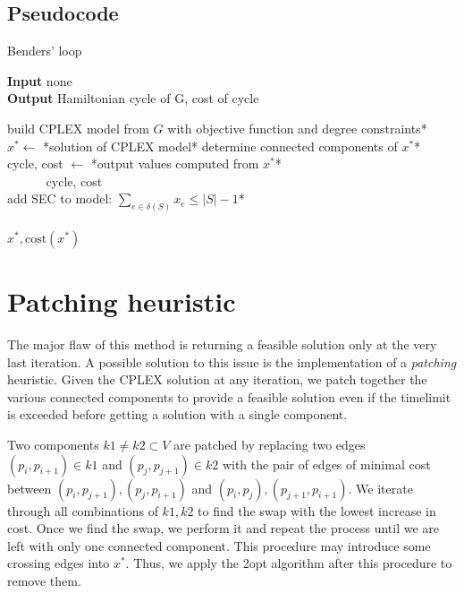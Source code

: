 \subsection{Pseudocode}
\begin{algorithm}[h]
    \caption{Benders' loop}

    \textbf{Input} none\\
    \textbf{Output} Hamiltonian cycle of G, cost of cycle\\
    \begin{algorithmic}

        \State *build CPLEX model from $G$ with objective function and degree constraints*\\
            \State $x^* \gets$ *solution of CPLEX model*
            \State *determine connected components of $x^*$*\\

                \State cycle, cost $\gets$ *output values computed from $x^*$*\\
                $\quad\;\;\quad\;\;$\Return cycle, cost
            \EndIf\\

                \State *add SEC to model: $\sum_{e\in\delta(S)}x_e\leq|S|-1$*
            \EndFor
        \EndWhile\\\\

        \Return $x^*, \text{cost}(x^*)$

    \end{algorithmic}
\end{algorithm}
\FloatBarrier

\section{Patching heuristic}
The major flaw of this method is returning a feasible solution only at the very last iteration. A possible solution to this issue is the implementation of a \textit{patching} heuristic. Given the CPLEX solution at any iteration, we patch together the various connected components to provide a feasible solution even if the timelimit is exceeded before getting a solution with a single component.

Two components $k1\neq k2\subset V$ are patched by replacing two edges $(p_i, p_{i+1})\in k1$ and $(p_j, p_{j+1})\in k2$ with the pair of edges of minimal cost between $(p_i,p_{j+1}),(p_j, p_{i+1})$ and $(p_i,p_j), (p_{j+1},p_{i+1})$. We iterate through all combinations of $k1,k2$ to find the swap with the lowest increase in cost. Once we find the swap, we perform it and repeat the process until we are left with only one connected component. This procedure may introduce some crossing edges into $x^*$. Thus, we apply the 2opt algorithm after this procedure to remove them.

